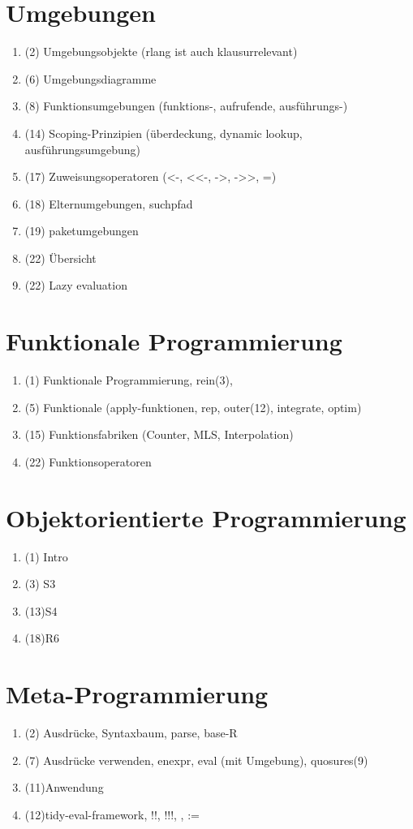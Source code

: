 \documentclass{article}
\begin{document}
\section{Umgebungen}
\begin{enumerate}
\item (2) Umgebungsobjekte (rlang ist auch klausurrelevant)
\item (6) Umgebungsdiagramme
\item (8) Funktionsumgebungen (funktions-, aufrufende, ausführungs-)
\item (14) Scoping-Prinzipien (überdeckung, dynamic lookup, ausführungsumgebung)
\item (17) Zuweisungsoperatoren (<-, <<-, ->, ->>, =)
\item (18) Elternumgebungen, suchpfad
\item (19) paketumgebungen
\item (22) Übersicht
\item (22) Lazy evaluation
\end{enumerate}

\section{Funktionale Programmierung}
\begin{enumerate}
    \item (1) Funktionale Programmierung, rein(3), 
    \item (5) Funktionale (apply-funktionen, rep, outer(12), integrate, optim)
    \item (15) Funktionsfabriken (Counter, MLS, Interpolation)
    \item (22) Funktionsoperatoren
\end{enumerate}

\section{Objektorientierte Programmierung}
\begin{enumerate}
\item (1) Intro
\item (3) S3
\item (13)S4
\item (18)R6
\end{enumerate}

\section{Meta-Programmierung}
\begin{enumerate}
    \item (2) Ausdrücke, Syntaxbaum, parse, base-R 
    \item (7) Ausdrücke verwenden, enexpr, eval (mit Umgebung), quosures(9)
    \item (11)Anwendung
    \item (12)tidy-eval-framework, !!, !!!, {{}}, :=
\end{enumerate}
\end{document}
